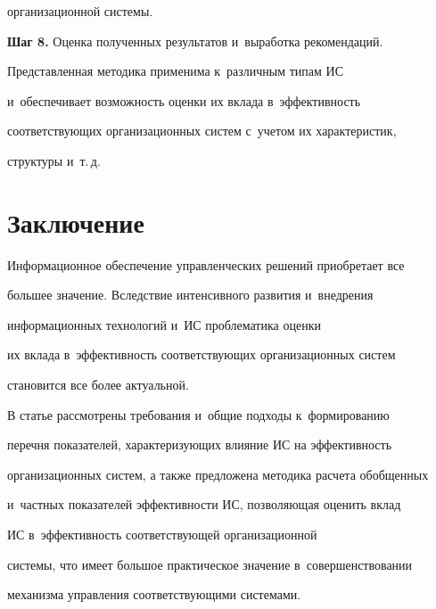 организационной системы. 

  

  \textbf{Шаг 8.} Оценка полученных результатов и~выработка рекомендаций.

  

  Представленная методика применима к~различным типам ИС 

  и~обеспечивает возможность оценки их вклада в~эффективность 

соответствующих организационных систем с~учетом их характеристик, 

структуры и~т.\,д.



\vspace*{-6pt} 

  

\section{Заключение}



\vspace*{-2pt} 



  Информационное обеспечение управленческих решений приобретает все 

большее значение. Вследствие интенсивного развития и~внедрения 

информационных технологий и~ИС проблематика оценки 

их вклада в~эффективность соответствующих организационных систем 

становится все более актуальной.

  

  В статье рассмотрены требования и~общие подходы к~формированию 

перечня показателей, характеризующих влияние ИС на эффективность 

организационных систем, а также предложена методика расчета обобщенных 

и~частных показателей эффективности ИС, позволяющая оценить вклад 

ИС в~эффективность соответствующей организационной 

системы, что имеет большое практическое значение в~совершенствовании 

механизма управления соответствующими системами.

  

